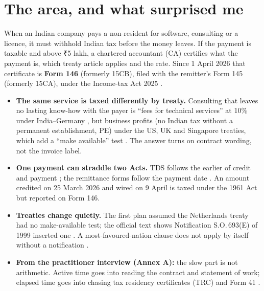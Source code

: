 \documentclass[10pt,a4paper]{article}
\begin{document}
\section{The area, and what surprised me}
When an Indian company pays a non-resident for software, consulting or a licence, it must withhold Indian tax before the money leaves. If the payment is taxable and above ₹5 lakh, a chartered accountant (CA) certifies what the payment is, which treaty article applies and the rate. Since 1 April 2026 that certificate is \textbf{Form 146} (formerly 15CB), filed with the remitter's Form 145 (formerly 15CA), under the Income-tax Act 2025 \cite{faqforms}.
\begin{itemize}
  \item \textbf{The same service is taxed differently by treaty.} Consulting that leaves no lasting know-how with the payer is ``fees for technical services'' at 10\% under India--Germany \cite{de}, but business profits (no Indian tax without a permanent establishment, PE) under the US, UK and Singapore treaties, which add a ``make available'' test \cite{us,uk,sg}. The answer turns on contract wording, not the invoice label.
  \item \textbf{One payment can straddle two Acts.} TDS follows the earlier of credit and payment \cite{faqtds}; the remittance forms follow the payment date \cite{faqforms}. An amount credited on 25 March 2026 and wired on 9 April is taxed under the 1961 Act but reported on Form 146.
  \item \textbf{Treaties change quietly.} The first plan assumed the Netherlands treaty had no make-available test; the official text shows Notification S.O.\,693(E) of 1999 inserted one \cite{nl}. A most-favoured-nation clause does not apply by itself without a notification \cite{nestle}.
  \item \textbf{From the practitioner interview (Annex A):} the slow part is not arithmetic. Active time goes into reading the contract and statement of work; elapsed time goes into chasing tax residency certificates (TRC) and Form 41 \cite{form41}.
\end{itemize}
\end{document}
